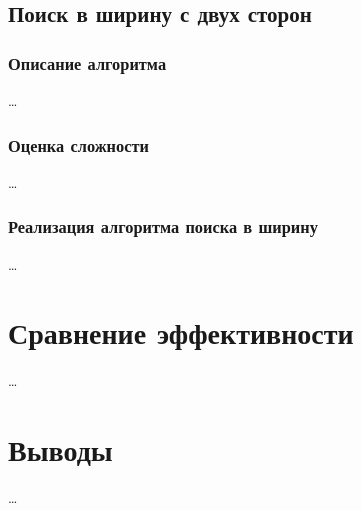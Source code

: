 \documentclass[a4paper, 12pt]{article}
\begin{document}
\subsection{Поиск в ширину с двух сторон}
\subsubsection{Описание алгоритма}
\ldots

\subsubsection{Оценка сложности}
\ldots

\subsubsection{Реализация алгоритма поиска в ширину}
\label{ssub:BFS_implementation}
\ldots

\section{Сравнение эффективности}
\ldots

\section{Выводы}
\ldots
\end{document}
